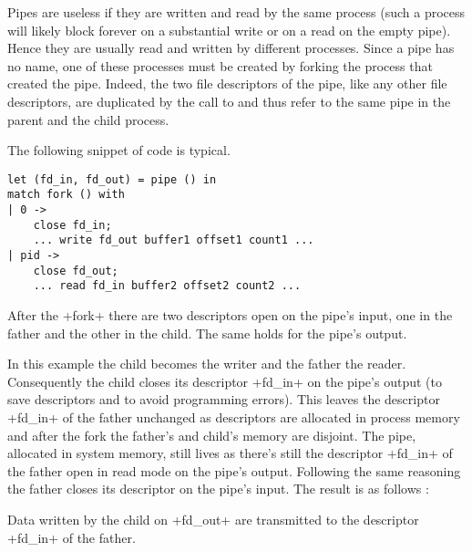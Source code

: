 Pipes are useless if they are written and read by the same process
(such a process will likely block forever on a substantial write or on
a read on the empty pipe). Hence they are usually read and written by
different processes. Since a pipe has no name, one of these processes
must be created by forking the process that created the pipe. Indeed,
the two file descriptors of the pipe, like any other file descriptors,
are duplicated by the call to  and thus refer to the
same pipe in the parent and the child process.
\begin{example} The following snippet of code is typical.
%
\begin{lstlisting}
let (fd_in, fd_out) = pipe () in
match fork () with
| 0 ->
    close fd_in;
    ... write fd_out buffer1 offset1 count1 ...
| pid ->
    close fd_out;
    ... read fd_in buffer2 offset2 count2 ...
\end{lstlisting}
% 
After the \ml+fork+ there are two descriptors open on the pipe's
input, one in the father and the other in the child. The same
holds for the pipe's output.
%
\begin{myimage}[width="45\%"]
\end{myimage}
% 
In this example the child becomes the writer and the father the
reader. Consequently the child closes its descriptor \ml+fd_in+ on the
pipe's output (to save descriptors and to avoid programming
errors). This leaves the descriptor \ml+fd_in+ of the father unchanged
as descriptors are allocated in process memory and after the fork the
father's and child's memory are disjoint. The pipe, allocated in system
memory, still lives as there's still the descriptor \ml+fd_in+ of the
father open in read mode on the pipe's output. Following the same
reasoning the father closes its descriptor on the pipe's input. The
result is as follows : 
%
\begin{myimage}[width="45\%"]
\end{myimage}
% 
Data written by the child on \ml+fd_out+ are transmitted to the
descriptor \ml+fd_in+ of the father.
\end{example}

